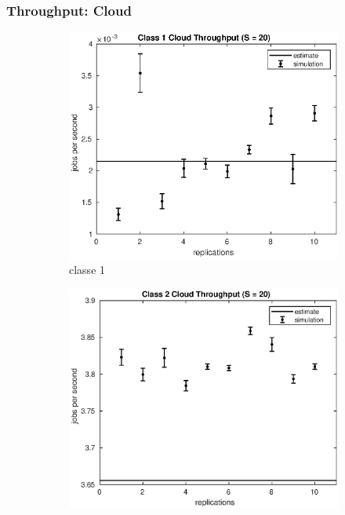 \subsubsection{Throughput: Cloud}
%
\begin{figure}[!h]
\centering
%
\begin{subfigure}[t]{0.49\textwidth}
\includegraphics[width=\textwidth]{figures/simul/20_500K_x1cloud}
\caption{classe 1}
\label{20_x1cloud}
\end{subfigure}
%
\begin{subfigure}[t]{0.49\textwidth}
\includegraphics[width=\textwidth]{figures/simul/20_500K_x2cloud}

\end{subfigure}
\end{figure}
